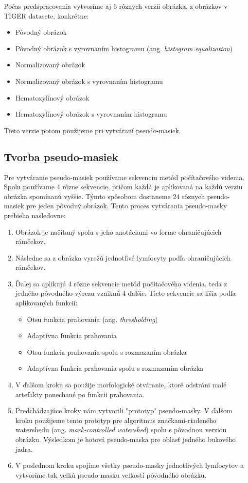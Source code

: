 Počas predspracovania vytvoríme aj 6 rôznych verzii obrázka, z obrázkov v TIGER datasete, konkrétne:

\begin{itemize}
    \item Pôvodný obrázok
    \item Pôvodný obrázok s vyrovnaním histogramu (ang. \textit{histogram equalization})
    \item Normalizovaný obrázok
    \item Normalizovaný obrázok s vyrovnaním histogramu
    \item Hematoxylínový obrázok
    \item Hematoxylínový obrázok s vyrovnaním histogramu
\end{itemize}

Tieto verzie potom použijeme pri vytváraní pseudo-masiek.

\subsection{Tvorba pseudo-masiek}
Pre vytváranie pseudo-masiek používame sekvenciu metód počítačového videnia. Spolu používame 4 rôzne sekvencie, pričom každá je aplikovaná na každú verziu obrázka spomínanú vyššie. Týmto spôsobom dostaneme 24 rôznych pseudo-masiek pre jeden pôvodný obrázok. Tento proces vytvárania pseudo-masky prebieha nasledovne:

\begin{enumerate}
    \item Obrázok je načítaný spolu s jeho anotáciami vo forme ohraničujúcich rámčekov.
    \item Následne sa z obrázka vyrežú jednotlivé lymfocyty podľa ohraničujúcich rámčekov.
    \item Ďalej sa aplikujú 4 rôzne sekvencie metód počítačového videnia, teda z jedného pôvodného výrezu vzniknú 4 ďalšie. Tieto sekvencie sa líšia podľa aplikovaných funkcií:
    \begin{itemize}
        \item Otsu funkcia prahovania (ang. \textit{thresholding})
        \item Adaptívna funkcia prahovania
        \item Otsu funkcia prahovania spolu s rozmazaním obrázka
        \item Adaptívna funkcia prahovania spolu s rozmazaním obrázka
    \end{itemize}
    \item V ďalšom kroku sa použije morfologické otváranie, ktoré odstráni malé artefakty ponechané po funkcii prahovania.
    \item Predchádzajúce kroky nám vytvorili "prototyp" pseudo-masky. V ďalšom kroku použijeme tento prototyp pre algoritmus značkami-riadeného watershedu (ang. \textit{mark-controlled watershed}) spolu s pôvodnou verziou obrázku. Výsledkom je hotová pseudo-maska pre oblasť jedného bukového jadra.
    \item V poslednom kroku spojíme všetky pseudo-masky jednotlivých lymfocytov a vytvoríme tak veľkú pseudo-masku veľkosti pôvodného obrázku.
\end{enumerate}

